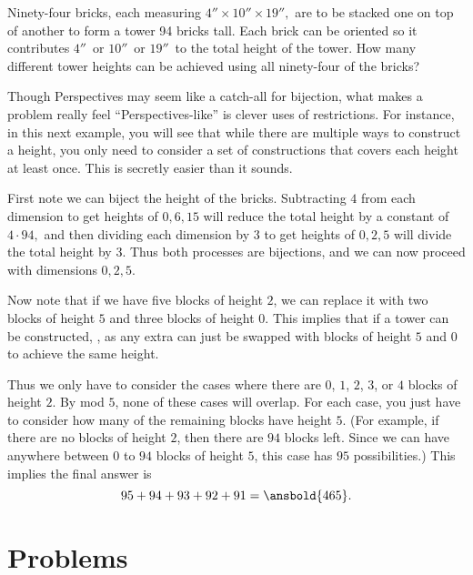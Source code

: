 \documentclass{article}
\begin{document}
\begin{exam}[AIME 1994/11]
Ninety-four bricks, each measuring $4''\times10''\times19'',$ are to be stacked one on top of another to form a tower 94 bricks tall. Each brick can be oriented so it contributes $4''\,$ or $10''\,$ or $19''\,$ to the total height of the tower. How many different tower heights can be achieved using all ninety-four of the bricks? 
\end{exam}

Though Perspectives may seem like a catch-all for bijection, what makes a problem really feel ``Perspectives-like'' is clever uses of restrictions. For instance, in this next example, you will see that while there are multiple ways to construct a height, you only need to consider a set of constructions that covers each height at least once. This is secretly easier than it sounds.

\begin{sol}
First note we can biject the height of the bricks. Subtracting $4$ from each dimension to get heights of $0, 6, 15$ will reduce the total height by a constant of $4\cdot 94,$ and then dividing each dimension by $3$ to get heights of $0, 2, 5$ will divide the total height by $3$. Thus both processes are bijections, and we can now proceed with dimensions $0, 2, 5$.

Now note that if we have five blocks of height $2$, we can replace it with two blocks of height $5$ and three blocks of height $0$. This implies that if a tower can be constructed, , as any extra can just be swapped with blocks of height $5$ and $0$ to achieve the same height.

Thus we only have to consider the cases where there are $0$, $1$, $2$, $3$, or $4$ blocks of height $2$. By mod $5$, none of these cases will overlap. For each case, you just have to consider how many of the remaining blocks have height $5$. (For example, if there are no blocks of height $2$, then there are $94$ blocks left. Since we can have anywhere between $0$ to $94$ blocks of height $5$, this case has $95$ possibilities.) This implies the final answer is
\[95+94+93+92+91=\ansbold{465}.\]
\end{sol}

\pagebreak

\section{Problems}
\end{document}
